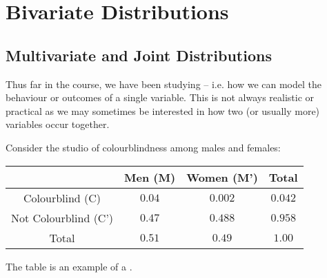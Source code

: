 \chapter{Bivariate Distributions}

\section{Multivariate and Joint Distributions}

Thus far in the course, we have been studying  -- i.e. how we can model the behaviour or outcomes of a single variable. This is not always realistic or practical as we may sometimes be interested in how two (or usually more) variables occur together.

Consider the studio of colourblindness among males and females:

\begin{center}
    \begin{tabular}{|| c | c c | c ||}
        \hline
                             & Men (M) & Women (M') & Total   \\
        \hline
        \hline
        Colourblind (C)      & $0.04$  & $0.002$    & $0.042$ \\
        \hline
        Not Colourblind (C') & $0.47$  & $0.488$    & $0.958$ \\
        \hline \hline
        Total                & $0.51$  & $0.49$     & $1.00$  \\
        \hline
    \end{tabular}
\end{center}

The table is an example of a . 

